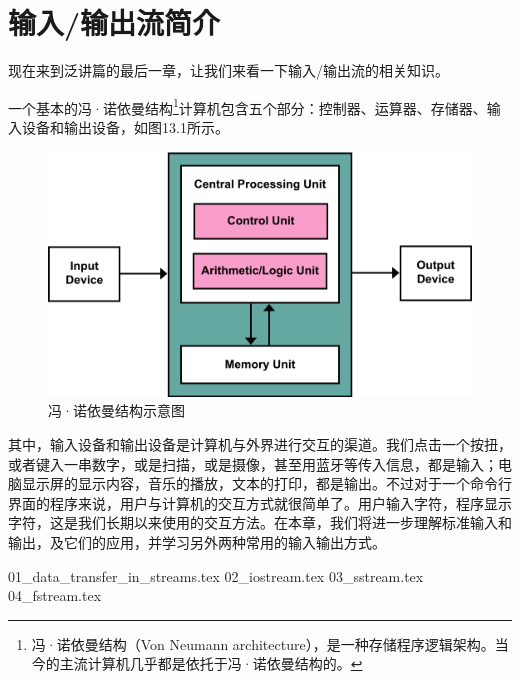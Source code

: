 \chapter{输入/输出流简介}
现在来到泛讲篇的最后一章，让我们来看一下输入/输出流的相关知识。\par
一个基本的冯·诺依曼结构\footnote{冯·诺依曼结构（Von Neumann architecture），是一种存储程序逻辑架构。当今的主流计算机几乎都是依托于冯·诺依曼结构的。}计算机包含五个部分：控制器、运算器、存储器、输入设备和输出设备，如图13.1所示。\par
\begin{figure}[htbp]
    \centering
    \includegraphics[width=.5\textwidth]{../images/generalized_parts/13_von_neumann_architecture.png}
    \caption{冯·诺依曼结构示意图}
\end{figure}
其中，输入设备和输出设备是计算机与外界进行交互的渠道。我们点击一个按扭，或者键入一串数字，或是扫描，或是摄像，甚至用蓝牙等传入信息，都是输入；电脑显示屏的显示内容，音乐的播放，文本的打印，都是输出。不过对于一个命令行界面的程序来说，用户与计算机的交互方式就很简单了。用户输入字符，程序显示字符，这是我们长期以来使用的交互方法。在本章，我们将进一步理解标准输入和输出，及它们的应用，并学习另外两种常用的输入输出方式。\par
{01_data_transfer_in_streams.tex}
{02_iostream.tex}
{03_sstream.tex}
{04_fstream.tex}
